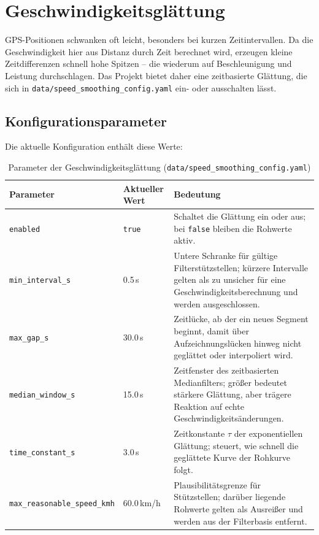 \chapter{Geschwindigkeitsglättung}
\label{ch:glaettung}

GPS-Positionen schwanken oft leicht, besonders bei kurzen Zeitintervallen. Da die Geschwindigkeit hier aus Distanz durch Zeit berechnet wird, erzeugen kleine Zeitdifferenzen schnell hohe Spitzen -- die wiederum auf Beschleunigung und Leistung durchschlagen. Das Projekt bietet daher eine zeitbasierte Glättung, die sich in \texttt{data/speed\_smoothing\_config.yaml} ein- oder ausschalten lässt.

\section{Konfigurationsparameter}

Die aktuelle Konfiguration enthält diese Werte:
\begin{table}[htbp]
\centering
\caption{Parameter der Geschwindigkeitsglättung (\texttt{data/speed\_smoothing\_config.yaml})}
\label{tab:smoothing-config}
\begin{tabularx}{\textwidth}{@{}llX@{}}
\toprule
Parameter & Aktueller Wert & Bedeutung \\
\midrule
\texttt{enabled} & \texttt{true} & Schaltet die Glättung ein oder aus; bei \texttt{false} bleiben die Rohwerte aktiv. \\
\texttt{min\_interval\_s} & 0.5\,s & Untere Schranke für gültige Filterstützstellen; kürzere Intervalle gelten als zu unsicher für eine Geschwindigkeitsberechnung und werden ausgeschlossen. \\
\texttt{max\_gap\_s} & 30.0\,s & Zeitlücke, ab der ein neues Segment beginnt, damit über Aufzeichnungslücken hinweg nicht geglättet oder interpoliert wird. \\
\texttt{median\_window\_s} & 15.0\,s & Zeitfenster des zeitbasierten Medianfilters; größer bedeutet stärkere Glättung, aber trägere Reaktion auf echte Geschwindigkeitsänderungen. \\
\texttt{time\_constant\_s} & 3.0\,s & Zeitkonstante \(\tau\) der exponentiellen Glättung; steuert, wie schnell die geglättete Kurve der Rohkurve folgt. \\
\texttt{max\_reasonable\_speed\_kmh} & 60.0\,km/h & Plausibilitätsgrenze für Stützstellen; darüber liegende Rohwerte gelten als Ausreißer und werden aus der Filterbasis entfernt. \\
\bottomrule
\end{tabularx}
\end{table}

